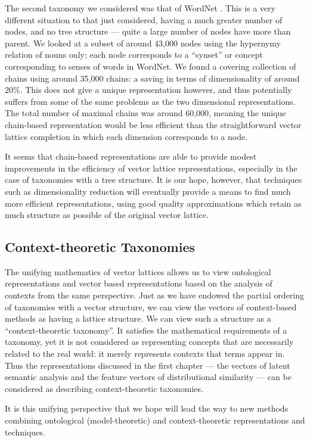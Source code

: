 \documentclass{report}
\begin{document}
The second taxonomy we considered was that of WordNet \citep{Fellbaum:98}. This is a very different situation to that just considered, having a much greater number of nodes, and no tree structure --- quite a large number of nodes have more than parent. We looked at a subset of around 43,000 nodes using the hypernymy relation of nouns only; each node corresponds to a ``synset'' or concept corresponding to senses of words in WordNet. We found a covering collection of chains using around 35,000 chains: a saving in terms of dimensionality of around 20\%. This does not give a unique representation however, and thus potentially suffers from some of the same problems as the two dimensional representations. The total number of maximal chains was around 60,000, meaning the unique chain-based representation would be less efficient than the straightforward vector lattice completion in which each dimension corresponds to a node.

It seems that chain-based representations are able to provide modest improvements in the efficiency of vector lattice representations, especially in the case of taxonomies with a tree structure. It is our hope, however, that techniques such as dimensionality reduction will eventually provide a means to find much more efficient representations, using good quality approximations which retain as much structure as possible of the original vector lattice.

\subsection{Context-theoretic Taxonomies}

The unifying mathematics of vector lattices allows us to view ontological representations and vector based representations based on the analysis of contexts from the same perspective. Just as we have endowed the partial ordering of taxonomies with a vector structure, we can view the vectors of context-based methods as having a lattice structure. We can view such a structure as a ``context-theoretic taxonomy''. It satisfies the mathematical requirements of a taxonomy, yet it is not considered as representing concepts that are necessarily related to the real world: it merely represents contexts that terms appear in. Thus the representations discussed in the first chapter --- the vectors of latent semantic analysis and the feature vectors of distributional similarity --- can be considered as describing context-theoretic taxonomies.

It is this unifying perspective that we hope will lead the way to new methods combining ontological (model-theoretic) and context-theoretic representations and techniques.
\end{document}
